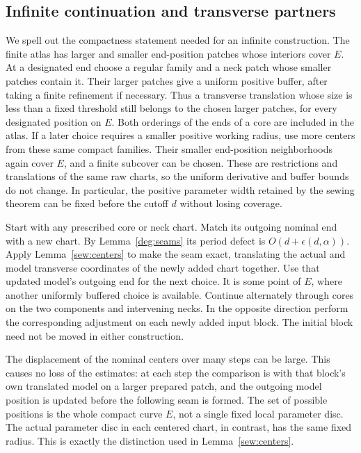 \subsection{Infinite continuation and transverse partners}

We spell out the compactness statement needed for an infinite
construction.  The finite atlas has larger and smaller end-position
patches whose interiors cover $E$.  At a designated end choose a
regular family and a neck patch whose smaller patches contain it.
Their larger patches give a uniform positive buffer, after taking
a finite refinement if necessary.  Thus a transverse translation
whose size is less than a fixed threshold still belongs to the
chosen larger patches, for every designated position on $E$.
Both orderings of the ends of a core are included in the atlas.
If a later choice requires a smaller positive working radius,
use more centers from these same compact families.  Their smaller
end-position neighborhoods again cover $E$, and a finite subcover
can be chosen.  These are restrictions and translations of the
same raw charts, so the uniform derivative and buffer bounds do
not change.  In particular, the positive parameter width retained
by the sewing theorem can be fixed before the cutoff $d$ without
losing coverage.

Start with any prescribed core or neck chart.  Match its outgoing
nominal end with a new chart.  By Lemma~\ref{deg:seams} its period
defect is $O(d+\epsilon(d,\alpha))$.  Apply
Lemma~\ref{sew:centers} to make the seam exact, translating the
actual and model transverse coordinates of the newly added chart
together.  Use that updated model's outgoing end for the next
choice.  It is some point of $E$, where another uniformly
buffered choice is available.  Continue alternately through
cores on the two components and intervening necks.  In the
opposite direction perform the corresponding adjustment on
each newly added input block.  The initial block need not be
moved in either construction.

The displacement of the nominal centers over many steps can be
large.  This causes no loss of the estimates: at each step the
comparison is with that block's own translated model on a
larger prepared patch, and the outgoing model position is
updated before the following seam is formed.  The set of
possible positions is the whole compact curve $E$, not a
single fixed local parameter disc.  The actual parameter disc
in each centered chart, in contrast, has the same fixed radius.
This is exactly the distinction used in
Lemma~\ref{sew:centers}.

